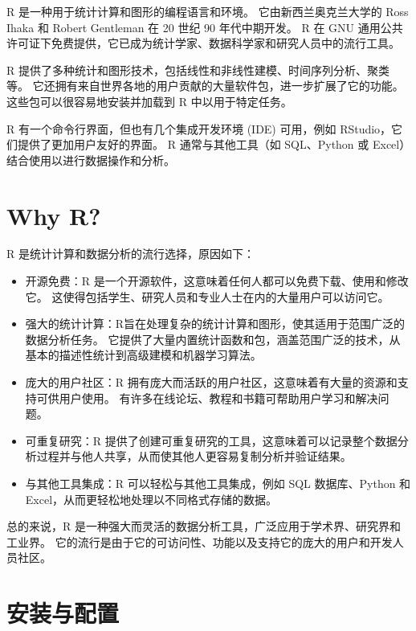 \documentclass[
]{book}
\begin{document}
R 是一种用于统计计算和图形的编程语言和环境。 它由新西兰奥克兰大学的 Ross Ihaka 和 Robert Gentleman 在 20 世纪 90 年代中期开发。 R 在 GNU 通用公共许可证下免费提供，它已成为统计学家、数据科学家和研究人员中的流行工具。

R 提供了多种统计和图形技术，包括线性和非线性建模、时间序列分析、聚类等。 它还拥有来自世界各地的用户贡献的大量软件包，进一步扩展了它的功能。 这些包可以很容易地安装并加载到 R 中以用于特定任务。

R 有一个命令行界面，但也有几个集成开发环境 (IDE) 可用，例如 RStudio，它们提供了更加用户友好的界面。 R 通常与其他工具（如 SQL、Python 或 Excel）结合使用以进行数据操作和分析。

\hypertarget{why-r}{%
\section{Why R?}\label{why-r}}

R 是统计计算和数据分析的流行选择，原因如下：

\begin{itemize}
\item
  开源免费：R 是一个开源软件，这意味着任何人都可以免费下载、使用和修改它。 这使得包括学生、研究人员和专业人士在内的大量用户可以访问它。
\item
  强大的统计计算：R旨在处理复杂的统计计算和图形，使其适用于范围广泛的数据分析任务。 它提供了大量内置统计函数和包，涵盖范围广泛的技术，从基本的描述性统计到高级建模和机器学习算法。
\item
  庞大的用户社区：R 拥有庞大而活跃的用户社区，这意味着有大量的资源和支持可供用户使用。 有许多在线论坛、教程和书籍可帮助用户学习和解决问题。
\item
  可重复研究：R 提供了创建可重复研究的工具，这意味着可以记录整个数据分析过程并与他人共享，从而使其他人更容易复制分析并验证结果。
\item
  与其他工具集成：R 可以轻松与其他工具集成，例如 SQL 数据库、Python 和 Excel，从而更轻松地处理以不同格式存储的数据。
\end{itemize}

总的来说，R 是一种强大而灵活的数据分析工具，广泛应用于学术界、研究界和工业界。 它的流行是由于它的可访问性、功能以及支持它的庞大的用户和开发人员社区。

\hypertarget{ux5b89ux88c5ux4e0eux914dux7f6e}{%
\section{安装与配置}\label{ux5b89ux88c5ux4e0eux914dux7f6e}}
\end{document}
